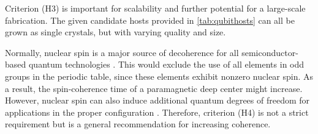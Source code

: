 \begin{table}[!ht]
\centering
\noindent{}
\caption{Table taken from \citeauthor{Gordon2013} \cite{Gordon2013} that lists a number of tetrahedrally coordinated hosts whose band gaps are larger than $2.0$ (eV), and compares it to diamond and Si. All experimental values are from Ref. \cite{Martienssen2005}, except for where explicity cited otherwise. }
\label{tab:qubithosts}
\end{table}

Criterion (H3) is important for scalability and further potential for a large-scale fabrication. The given candidate hosts provided in \autoref{tab:qubithosts} can all be grown as single crystals, but with varying quality and size.

\noindent Normally, nuclear spin is a major source of decoherence for all semiconductor-based quantum technologies \cite{Ladd2010}. This would exclude the use of all elements in odd groups in the periodic table, since these elements exhibit nonzero nuclear spin. As a result, the spin-coherence time of a paramagnetic deep center \cite{Weber2010} might increase. However, nuclear spin can also induce additional quantum degrees of freedom for applications in the proper configuration \cite{Bassett2019}. Therefore, criterion (H4) is not a strict requirement but is a general recommendation for increasing coherence.  %

